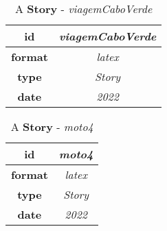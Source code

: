 \documentclass{article}
\begin{document}
    \begin{table}[ht!]
        \centering
        \begin{tabular}{|c|c|}
            \hline
            
                \textbf{ id } & \textit{ viagemCaboVerde } \\
                \hline
            
                \textbf{ format } & \textit{ latex } \\
                \hline
            
                \textbf{ type } & \textit{ Story } \\
                \hline
            
                \textbf{ date } & \textit{ 2022 } \\
                \hline
            
        \end{tabular}
        \caption{A \textbf{ Story }-\textit{ viagemCaboVerde }} %
        \label{table:\arabic{tablecounter2}} %
    \end{table}

    \begin{table}[ht!]
        \centering
        \begin{tabular}{|c|c|}
            \hline
            
                \textbf{ id } & \textit{ moto4 } \\
                \hline
            
                \textbf{ format } & \textit{ latex } \\
                \hline
            
                \textbf{ type } & \textit{ Story } \\
                \hline
            
                \textbf{ date } & \textit{ 2022 } \\
                \hline
            
        \end{tabular}
        \caption{A \textbf{ Story }-\textit{ moto4 }} %
        \label{table:\arabic{tablecounter2}} %
    \end{table}
\end{document}

